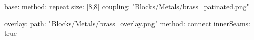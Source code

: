 base:
  method: repeat
  size: [8,8]
  coupling: "Blocks/Metals/brass_patinated.png"
  
overlay:
  path: "Blocks/Metals/brass_overlay.png"
  method: connect
  innerSeams: true